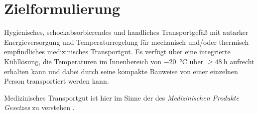 \chapter{Zielformulierung}
	Hygienisches, schockabsorbierendes und handliches Transportgefäß mit autarker Energieversorgung und Temperaturregelung für
	mechanisch und/oder thermisch empfindliches medizinisches Transportgut. Es verfügt über eine integrierte Kühllösung, die Temperaturen
	im Innenbereich von \SI{-20}{\celsius} über \(\geq \SI{48}{\hour}\) aufrecht erhalten kann und dabei durch seine kompakte Bauweise
	von einer einzelnen Person transportiert werden kann.\par\medskip

	Medizinisches Transportgut ist hier im Sinne der des \textit{Medizinischen Produkte Gesetzes} zu verstehen \cite{MPG}.